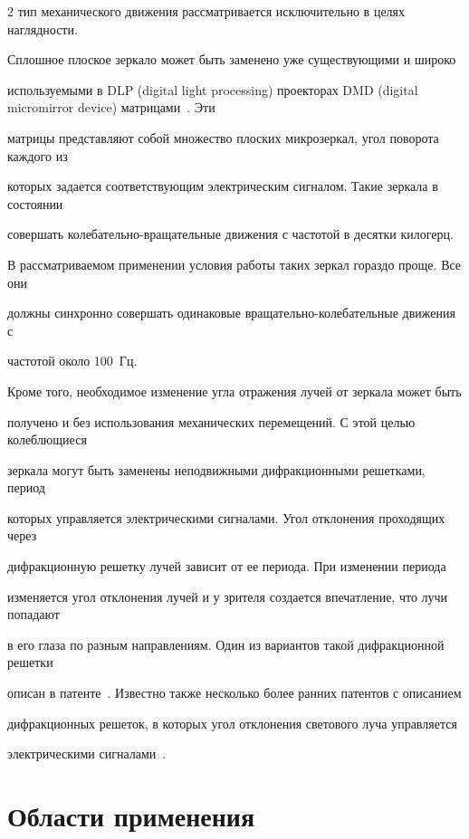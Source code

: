 \begin{multicols}{2}
тип механического движения рассматривается исключительно в целях наглядности. 

Сплошное плоское зеркало может быть заменено уже существующими и широко 

используемыми в DLP (digital light processing) проекторах DMD (digital micromirror device) матрицами~\cite{3t}. Эти 

матрицы пред\-став\-ля\-ют собой множество плоских микрозеркал, угол поворота каждого из 

которых задается соответствующим электрическим сигналом. Такие зеркала в состоянии 

совершать колебательно-вращательные движения с частотой в десятки килогерц. 

   В рассматриваемом применении условия работы таких зеркал гораздо проще. Все они 

должны синхронно совершать одинаковые вращательно-колебательные движения с 

частотой около 100~Гц. 



  

  Кроме того, необходимое изменение угла отражения лучей от зеркала может быть 

получено и без использования механических перемещений. С этой целью колеблющиеся 

зеркала могут быть заменены неподвижными дифракционными решетками, период 

которых управляется электрическими сигналами. Угол отклонения проходящих через 

дифракционную решетку лучей зависит от ее периода. При изменении периода 

изменяется угол отклонения лучей и у зрителя создается впечатление, что лучи попадают 

в его глаза по разным направлениям. Один из вариантов такой дифракционной решетки 

описан в патенте~\cite{4t}. Известно также несколько более ранних патентов с описанием 

дифракционных решеток, в которых угол отклонения светового луча управляется 

электрическими сигналами~\cite{5t}. 






\section{Области применения }




\end{multicols}
